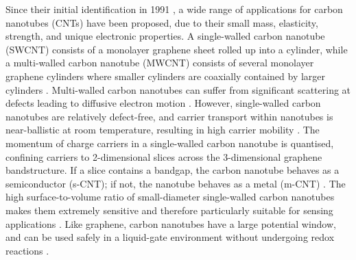 \documentclass[
  a4paper,
]{scrbook}
\begin{document}
Since their initial identification in 1991 \autocite{Iijima1991}, a wide
range of applications for carbon nanotubes (CNTs) have been proposed,
due to their small mass, elasticity, strength, and unique electronic
properties. A single-walled carbon nanotube (SWCNT) consists of a
monolayer graphene sheet rolled up into a cylinder, while a multi-walled
carbon nanotube (MWCNT) consists of several monolayer graphene cylinders
where smaller cylinders are coaxially contained by larger cylinders
\autocite{Dekker1999,Avouris2007,Cao2009,Rouhi2010,Shkodra2021}.
Multi-walled carbon nanotubes can suffer from significant scattering at
defects leading to diffusive electron motion \autocite{Dekker1999}.
However, single-walled carbon nanotubes are relatively defect-free, and
carrier transport within nanotubes is near-ballistic at room
temperature, resulting in high carrier mobility
\autocite{Dekker1999,Avouris2007,Cao2009,Rouhi2010,Shkodra2021}. The
momentum of charge carriers in a single-walled carbon nanotube is
quantised, confining carriers to 2-dimensional slices across the
3-dimensional graphene bandstructure. If a slice contains a bandgap, the
carbon nanotube behaves as a semiconductor (s-CNT); if not, the nanotube
behaves as a metal (m-CNT) \autocite{McEuen2002}. The high
surface-to-volume ratio of small-diameter single-walled carbon nanotubes
makes them extremely sensitive and therefore particularly suitable for
sensing applications \autocite{Cao2009,Yao2021,Shkodra2021}. Like
graphene, carbon nanotubes have a large potential window, and can be
used safely in a liquid-gate environment without undergoing redox
reactions \autocite{Ohno2015}.
\end{document}
